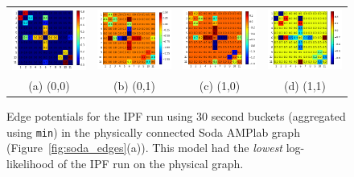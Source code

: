 \begin{figure}[ht]
\centering
\begin{tabular}{cccc}
\includegraphics[width=1.3in]{figs/30secmin00conf} & \includegraphics[width=1.3in]{figs/30secmin01conf} & \includegraphics[width=1.3in]{figs/30secmin10conf} & \includegraphics[width=1.3in]{figs/30secmin11conf} \\
(a) (0,0) & (b) (0,1) & (c) (1,0) & (d) (1,1) \\[6pt]
\end{tabular}
\caption{Edge potentials for the IPF run using 30 second buckets (aggregated using \texttt{min}) in the physically connected Soda AMPlab graph (Figure~\ref{fig:soda_edges}(a)). This model had the \emph{lowest} log-likelihood of the IPF run on the physical graph.}
\label{fig:30secminphysical}
\end{figure}

